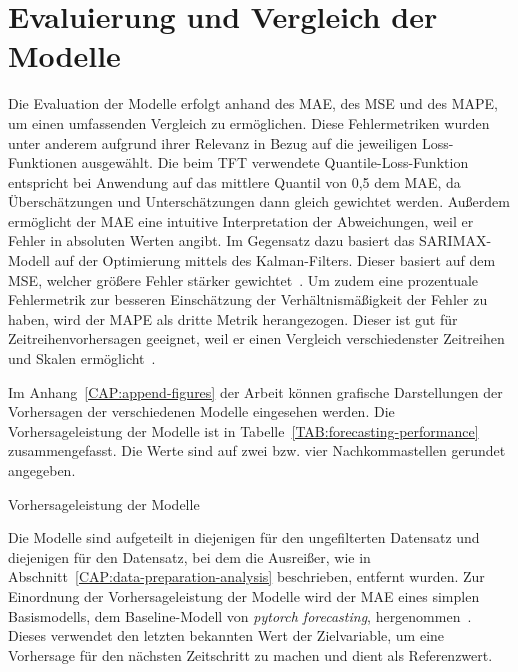 \section{Evaluierung und Vergleich der Modelle}
Die Evaluation der Modelle erfolgt anhand des \ac{MAE}, des \ac{MSE} und des \ac{MAPE}, um einen umfassenden Vergleich zu ermöglichen.
Diese Fehlermetriken wurden unter anderem aufgrund ihrer Relevanz in Bezug auf die jeweiligen Loss-Funktionen ausgewählt.
Die beim \ac{TFT} verwendete Quantile-Loss-Funktion entspricht bei Anwendung auf das mittlere Quantil von 0,5 dem \ac{MAE}, da Überschätzungen und Unterschätzungen dann gleich gewichtet werden.
Außerdem ermöglicht der \ac{MAE} eine intuitive Interpretation der Abweichungen, weil er Fehler in absoluten Werten angibt.
Im Gegensatz dazu basiert das \ac{SARIMAX}-Modell auf der Optimierung mittels des Kalman-Filters.
Dieser basiert auf dem \ac{MSE}, welcher größere Fehler stärker gewichtet~\cite{Lacey.1998}.
Um zudem eine prozentuale Fehlermetrik zur besseren Einschätzung der Verhältnismäßigkeit der Fehler zu haben, wird der \ac{MAPE} als dritte Metrik herangezogen.
Dieser ist gut für Zeitreihenvorhersagen geeignet, weil er einen Vergleich verschiedenster Zeitreihen und Skalen ermöglicht~\cite{Lazzeri.2021}.

Im Anhang~\ref{CAP:append-figures} der Arbeit können grafische Darstellungen der Vorhersagen der verschiedenen Modelle eingesehen werden.
Die Vorhersageleistung der Modelle ist in Tabelle~\ref{TAB:forecasting-performance} zusammengefasst.
Die Werte sind auf zwei bzw. vier Nachkommastellen gerundet angegeben.
\begin{table}[htbp]
 \centering
 \caption{Vorhersageleistung der Modelle}
 \label{TAB:forecasting-performance}
 
\end{table}
Die Modelle sind aufgeteilt in diejenigen für den ungefilterten Datensatz und diejenigen für den Datensatz, bei dem die Ausreißer, wie in Abschnitt~\ref{CAP:data-preparation-analysis} beschrieben, entfernt wurden.
Zur Einordnung der Vorhersageleistung der Modelle wird der \ac{MAE} eines simplen Basismodells, dem Baseline-Modell von \textit{pytorch forecasting}, hergenommen~\cite{PytorchForecastingDocumentation.20230410T20:05:46.000Zb}.
Dieses verwendet den letzten bekannten Wert der Zielvariable, um eine Vorhersage für den nächsten Zeitschritt zu machen und dient als Referenzwert.

